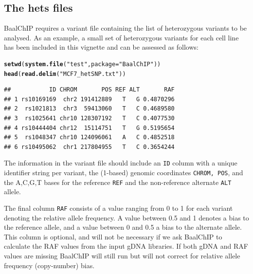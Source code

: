 \documentclass{article}\usepackage[]{graphicx}\usepackage[usenames,dvipsnames]{color}
\makeatletter
\newcommand{\hlstr}[1]{\textcolor[rgb]{0.192,0.494,0.8}{#1}}%
\newcommand{\hlstd}[1]{\textcolor[rgb]{0.345,0.345,0.345}{#1}}%
\newcommand{\hlkwc}[1]{\textcolor[rgb]{0.333,0.667,0.333}{#1}}%
\newcommand{\hlkwd}[1]{\textcolor[rgb]{0.737,0.353,0.396}{\textbf{#1}}}%
\newenvironment{kframe}{%
 \def\at@end@of@kframe{}%
 \ifinner\ifhmode%
  \def\at@end@of@kframe{\end{minipage}}%
  \begin{minipage}{\columnwidth}%
 \fi\fi%
 \def\FrameCommand##1{\hskip\@totalleftmargin \hskip-\fboxsep
 \colorbox{shadecolor}{##1}\hskip-\fboxsep
     \hskip-\linewidth \hskip-\@totalleftmargin \hskip\columnwidth}%
 \MakeFramed {\advance\hsize-\width
   \@totalleftmargin\z@ \linewidth\hsize
   \@setminipage}}%
 {\par\unskip\endMakeFramed%
 \at@end@of@kframe}
\newenvironment{knitrout}{}{} %
\makeatother
\begin{document}
\subsection{The hets files}

BaalChIP requires a \textquotedbl{}variant file\textquotedbl{} containing the list of heterozygous variants to be analysed. As an example, a small set of heterozygous variants for each cell line has been included in this vignette and can be assessed as follows:

\begin{knitrout}
\color{fgcolor}\begin{kframe}
\begin{alltt}
\hlkwd{setwd}\hlstd{(}\hlkwd{system.file}\hlstd{(}\hlstr{"test"}\hlstd{,}\hlkwc{package}\hlstd{=}\hlstr{"BaalChIP"}\hlstd{))}
\hlkwd{head}\hlstd{(}\hlkwd{read.delim}\hlstd{(}\hlstr{"MCF7_hetSNP.txt"}\hlstd{))}
\end{alltt}
\begin{verbatim}
##           ID CHROM       POS REF ALT       RAF
## 1 rs10169169  chr2 191412889   T   G 0.4870296
## 2  rs1021813  chr3  59413060   T   C 0.4689580
## 3  rs1025641 chr10 128307192   T   C 0.4077530
## 4 rs10444404 chr12  15114751   T   G 0.5195654
## 5  rs1048347 chr10 124096061   A   C 0.4852518
## 6 rs10495062  chr1 217804955   T   C 0.3654244
\end{verbatim}
\end{kframe}
\end{knitrout}

The information in the variant file should include an \texttt{ID} column with a unique identifier string per variant, the (1-based) genomic coordinates \texttt{CHROM, POS}, and the A,C,G,T bases for the reference \texttt{REF} and the non-reference alternate \texttt{ALT} allele. 

The final column \texttt{RAF} consists of a value ranging from 0 to 1 for each variant denoting the relative allele frequency. A value between 0.5 and 1 denotes a bias to the reference allele, and a value between 0 and 0.5 a bias to the alternate allele. This column is optional, and will not be necessary if we ask BaalChIP to calculate the RAF values from the input gDNA libraries. If both gDNA and RAF values are missing BaalChIP will still run but will not correct for relative allele frequency (copy-number) bias.

\end{document}
